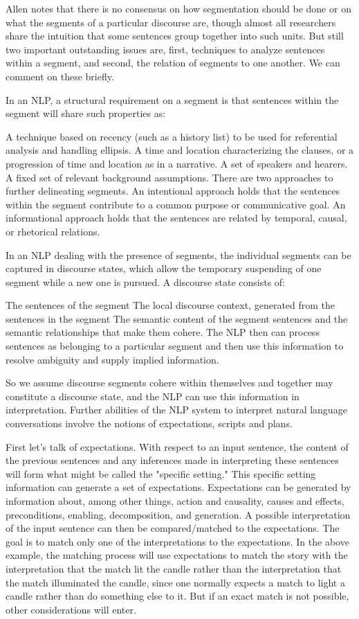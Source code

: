 Allen notes that there is no consensus on how segmentation should be done or on what the segments of a particular discourse are, though almost all researchers share the intuition that some sentences group together into such units. But still two important outstanding issues are, first, techniques to analyze sentences within a segment, and second, the relation of segments to one another. We can comment on these briefly.

In an NLP, a structural requirement on a segment is that sentences within the segment will share such properties as:

A technique based on recency (such as a history list) to be used for referential analysis and handling ellipsis.
A time and location characterizing the clauses, or a progression of time and location as in a narrative.
A set of speakers and hearers.
A fixed set of relevant background assumptions.
There are two approaches to further delineating segments. An intentional approach holds that the sentences within the segment contribute to a common purpose or communicative goal. An informational approach holds that the sentences are related by temporal, causal, or rhetorical relations.

In an NLP dealing with the presence of segments, the individual segments can be captured in discourse states, which allow the temporary suspending of one segment while a new one is pursued. A discourse state consists of:

The sentences of the segment
The local discourse context, generated from the sentences in the segment
The semantic content of the segment sentences and the semantic relationships that make them cohere.
The NLP then can process sentences as belonging to a particular segment and then use this information to resolve ambiguity and supply implied information.

So we assume discourse segments cohere within themselves and together may constitute a discourse state, and the NLP can use this information in interpretation. Further abilities of the NLP system to interpret natural language conversations involve the notions of expectations, scripts and plans.

First let's talk of expectations. With respect to an input sentence, the content of the previous sentences and any inferences made in interpreting these sentences will form what might be called the "specific setting." This specific setting information can generate a set of expectations. Expectations can be generated by information about, among other things, action and causality, causes and effects, preconditions, enabling, decomposition, and generation. A possible interpretation of the input sentence can then be compared/matched to the expectations. The goal is to match only one of the interpretations to the expectations. In the above example, the matching process will use expectations to match the story with the interpretation that the match lit the candle rather than the interpretation that the match illuminated the candle, since one normally expects a match to light a candle rather than do something else to it. But if an exact match is not possible, other considerations will enter.

